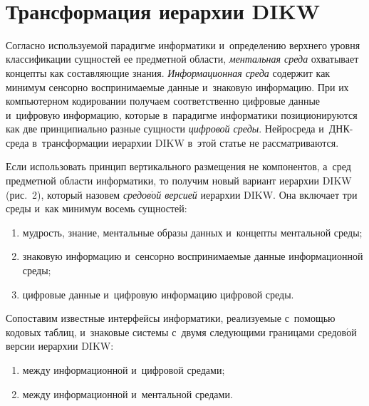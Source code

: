\begin{multicols}{2}
\begin{figure*}[b] %
\vspace*{-6pt}
\begin{center}
   \mbox{%
\epsfxsize=110mm 
}
\end{center}
\vspace*{-10pt}
\end{figure*}

\vspace*{-3pt}


\section{Трансформация иерархии DIKW}

\vspace*{-3pt}

  Согласно используемой парадигме информатики и~определению верх\-не\-го 
уров\-ня классификации сущностей ее предметной об\-ласти, \textit{ментальная 
среда} охватывает концепты как со\-став\-ля\-ющие знания. \textit{Информационная 
среда} содержит как минимум сен\-сор\-но вос\-при\-ни\-ма\-емые данные и~знаковую 
информацию. При их компьютерном кодировании получаем соответственно 
циф\-ро\-вые данные и~циф\-ро\-вую информацию, которые в~па\-ра\-диг\-ме 
информатики позиционируются как две принципиально раз\-ные сущности 
\textit{цифровой среды}. Нейросреда и~ДНК-сре\-да в~трансформации иерархии 
\mbox{DIKW} в~этой статье не рас\-смат\-ри\-ва\-ются.
  
  Если использовать принцип вертикального размещения не компонентов, 
а~сред пред\-мет\-ной об\-ласти информатики, то получим новый вариант 
иерархии \mbox{DIKW} (рис.~2), который назовем \textit{средов$\acute{\mbox{о}}$й 
версией} иерархии \mbox{DIKW}. Она включает три среды и~как минимум восемь сущностей: 
\begin{enumerate}[(1)]
\item мудрость, знание, ментальные образы данных  и~концепты ментальной \mbox{среды};\\[-15pt]
\item знаковую информацию и~сенсорно вос\-при\-ни\-ма\-емые данные 
информационной \mbox{среды};
\item цифровые данные и~циф\-ро\-вую информацию циф\-ро\-вой \mbox{среды}.
\end{enumerate}


  Сопоставим известные интерфейсы информатики, ре\-а\-ли\-зу\-емые  
с~по\-мощью кодовых таб\-лиц, и~знаковые сис\-темы с~двумя следующими границами 
средов$\acute{\mbox{о}}$й версии иерархии \mbox{DIKW}:
  \begin{enumerate}[(1)]
\item между информационной и~циф\-ро\-вой сре\-дами;
\item между информационной и~ментальной сре\-дами.
\end{enumerate}


\end{multicols}
